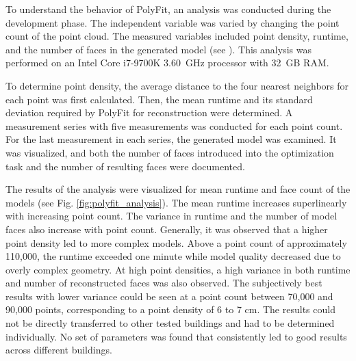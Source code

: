 \begin{English}
    To understand the behavior of PolyFit, an analysis was conducted during the development phase. The independent variable was varied by changing the point count of the point cloud. The measured variables included point density, runtime, and the number of faces in the generated model (see ). This analysis was performed on an Intel Core i7-9700K 3.60~GHz processor with 32~GB RAM.

    To determine point density, the average distance to the four nearest neighbors for each point was first calculated. Then, the mean runtime and its standard deviation required by PolyFit for reconstruction were determined. A measurement series with five measurements was conducted for each point count. For the last measurement in each series, the generated model was examined. It was visualized, and both the number of faces introduced into the optimization task and the number of resulting faces were documented.

    The results of the analysis were visualized for mean runtime and face count of the models (see Fig. \ref{fig:polyfit_analysis}). The mean runtime increases superlinearly with increasing point count. The variance in runtime and the number of model faces also increase with point count. Generally, it was observed that a higher point density led to more complex models. Above a point count of approximately 110,000, the runtime exceeded one minute while model quality decreased due to overly complex geometry. At high point densities, a high variance in both runtime and number of reconstructed faces was also observed. The subjectively best results with lower variance could be seen at a point count between 70,000 and 90,000 points, corresponding to a point density of 6 to 7 cm. The results could not be directly transferred to other tested buildings and had to be determined individually. No set of parameters was found that consistently led to good results across different buildings.
\end{English}

